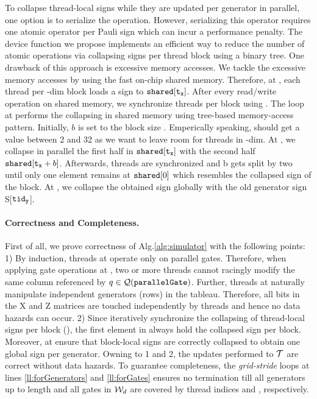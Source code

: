 \documentclass[runningheads]{llncs}
\begin{document}
To collapse thread-local signs while they are updated per generator in parallel, one option is to serialize the operation. However, serializing this operator requires one atomic operator per Pauli sign which can incur a performance penalty. The device function \collapseSigns we propose implements an efficient way to reduce the number of atomic operations via collapsing signs per thread block using a binary tree. One drawback of this approach is excessive memory accesses. We tackle the excessive memory accesses by using the fast on-chip shared memory. Therefore, at , each thread \tx per -dim block loads a sign \sign to $\texttt{shared}[\texttt{t}_{\textbf{\texttt{x}}}]$. After every read/write operation on shared memory, we synchronize threads per block using \syncThreads. The loop at  performs the collapsing in shared memory using tree-based memory-access pattern. Initially, $b$ is set to the block size \blockDim. Emperically speaking,  \blockDim should get a value between 2 and 32 as we want to leave room for threads in -dim. At , we collapse in parallel the first half in $\texttt{shared}[\texttt{t}_{\textbf{\texttt{x}}}]$ with the second half $\texttt{shared}[\texttt{t}_{\textbf{\texttt{x}}} + b]$. Afterwards, threads are synchronized and b gets split by two until only one element remains at $\texttt{shared}[0]$ which resembles the collapsed sign of the block. At , we collapse the obtained sign globally with the old generator sign S[$\texttt{tid}_{\textbf{\texttt{y}}}$].

\paragraph{Correctness and Completeness.} 
First of all, we prove correctness of Alg.\ref{alg:simulator} with the following points: 1) By induction, threads at  operate only on parallel gates. %
Therefore, when applying gate operations at , two or more threads cannot racingly modify the same column referenced by $q \in \mathcal{Q}(\texttt{parallelGate})$. Further, threads at  naturally manipulate independent generators (rows) in the tableau. Therefore, all bits in the X and Z matrices are touched independently by threads and hence no data hazards can occur. 2) Since \collapseSigns iteratively synchronize the collapsing of thread-local signs per block (), the first element in \shared always hold the collapsed sign per block. Moreover, \atomicXOR at  ensure that block-local signs are correctly collapsed to obtain one global sign per generator. Owning to 1 and 2, the updates performed to $\mathcal{T}$ are correct without data hazards.  
To guarantee completeness, the \emph{grid-stride} loops at lines \ref{ll:forGenerators} and \ref{ll:forGates} ensures no termination till all generators up to length \tableauPartition and all gates in $\mathcal{W}_d$ are covered by thread indices \tidy and \tidx, respectively.
\end{document}
